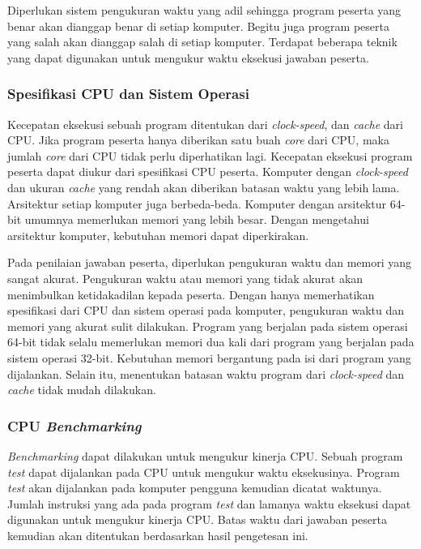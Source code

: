\par Diperlukan sistem pengukuran waktu yang adil sehingga program peserta yang benar akan dianggap benar di setiap komputer. Begitu juga program peserta yang salah akan dianggap salah di setiap komputer. Terdapat beberapa teknik yang dapat digunakan untuk mengukur waktu eksekusi jawaban peserta.

\subsubsection{Spesifikasi CPU dan Sistem Operasi}

\par Kecepatan eksekusi sebuah program ditentukan dari \textit{clock-speed}, dan \textit{cache} dari CPU. Jika program peserta hanya diberikan satu buah \textit{core} dari CPU, maka jumlah \textit{core} dari CPU tidak perlu diperhatikan lagi. Kecepatan eksekusi program peserta dapat diukur dari spesifikasi CPU peserta. Komputer dengan \textit{clock-speed} dan ukuran \textit{cache} yang rendah akan diberikan batasan waktu yang lebih lama. Arsitektur setiap komputer juga berbeda-beda. Komputer dengan arsitektur 64-bit umumnya memerlukan memori yang lebih besar. Dengan mengetahui arsitektur komputer, kebutuhan memori dapat diperkirakan.

\par Pada penilaian jawaban peserta, diperlukan pengukuran waktu dan memori yang sangat akurat. Pengukuran waktu atau memori yang tidak akurat akan menimbulkan ketidakadilan kepada peserta. Dengan hanya memerhatikan spesifikasi dari CPU dan sistem operasi pada komputer, pengukuran waktu dan memori yang akurat sulit dilakukan. Program yang berjalan pada sistem operasi 64-bit tidak selalu memerlukan memori dua kali dari program yang berjalan pada sistem operasi 32-bit. Kebutuhan memori bergantung pada isi dari program yang dijalankan. Selain itu, menentukan batasan waktu program dari \textit{clock-speed} dan \textit{cache} tidak mudah dilakukan. 

\subsubsection{CPU \textit{Benchmarking}}

\par \textit{Benchmarking} dapat dilakukan untuk mengukur kinerja CPU. Sebuah program \textit{test} dapat dijalankan pada CPU untuk mengukur waktu eksekusinya. Program \textit{test} akan dijalankan pada komputer pengguna kemudian dicatat waktunya. Jumlah instruksi yang ada pada program \textit{test} dan lamanya waktu eksekusi dapat digunakan untuk mengukur kinerja CPU. Batas waktu dari jawaban peserta kemudian akan ditentukan berdasarkan hasil pengetesan ini.

